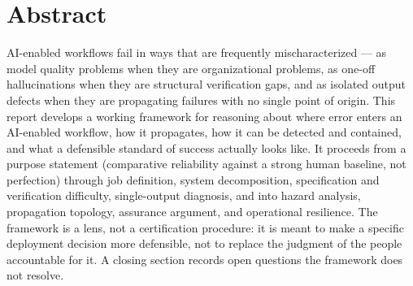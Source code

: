 \section*{Abstract}

AI-enabled workflows fail in ways that are frequently mischaracterized --- as model quality problems when they are organizational problems, as one-off hallucinations when they are structural verification gaps, and as isolated output defects when they are propagating failures with no single point of origin. This report develops a working framework for reasoning about where error enters an AI-enabled workflow, how it propagates, how it can be detected and contained, and what a defensible standard of success actually looks like. It proceeds from a purpose statement (comparative reliability against a strong human baseline, not perfection) through job definition, system decomposition, specification and verification difficulty, single-output diagnosis, and into hazard analysis, propagation topology, assurance argument, and operational resilience. The framework is a lens, not a certification procedure: it is meant to make a specific deployment decision more defensible, not to replace the judgment of the people accountable for it. A closing section records open questions the framework does not resolve.
